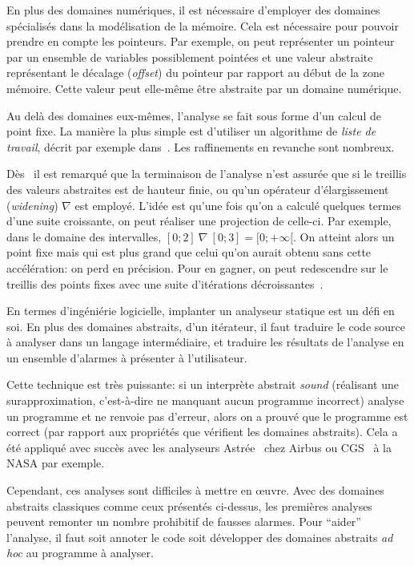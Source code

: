 En plus des domaines numériques, il est nécessaire d'employer des domaines
spécialisés dans la modélisation de la mémoire. Cela est nécessaire pour pouvoir
prendre en compte les pointeurs. Par exemple, on peut représenter un pointeur
par un ensemble de variables possiblement pointées et une valeur abstraite
représentant le décalage (\emph{offset}) du pointeur par rapport au début de la
zone mémoire. Cette valeur peut elle-même être abstraite par un domaine
numérique.

Au delà des domaines eux-mêmes, l'analyse se fait sous forme d'un calcul de
point fixe. La manière la plus simple est d'utiliser un algorithme de
\emph{liste de travail}, décrit par exemple dans~\cite{tapsoft95}. Les
raffinements en revanche sont nombreux.

Dès~\cite{Cousot77} il est remarqué que la terminaison de l'analyse n'est
assurée que si le treillis des valeurs abstraites est de hauteur finie, ou qu'un
opérateur d'élargissement (\emph{widening}) $\nabla$ est employé. L'idée est
qu'une fois qu'on a calculé quelques termes d'une suite croissante, on peut
réaliser une projection de celle-ci. Par exemple, dans le domaine des
intervalles, $[0;2]~\nabla~[0;3] = [0;+\infty[$. On atteint alors un point fixe
mais qui est plus grand que celui qu'on aurait obtenu sans cette accélération:
on perd en précision. Pour en gagner, on peut redescendre sur le treillis des
points fixes avec une suite d'itérations décroissantes~\cite{granger,policy}.

En termes d'ingéniérie logicielle, implanter un analyseur statique est un défi
en soi. En plus des domaines abstraits, d'un itérateur, il faut traduire le code
source à analyser dans un langage intermédiaire, et traduire les résultats de
l'analyse en un ensemble d'alarmes à présenter à l'utilisateur.

Cette technique est très puissante: si un interprète abstrait \emph{sound}
(réalisant une surapproximation, c'est-à-dire ne manquant aucun programme
incorrect) analyse un programme et ne renvoie pas d'erreur, alors on a prouvé
que le programme est correct (par rapport aux propriétés que vérifient les
domaines abstraits). Cela a été appliqué avec succès avec les analyseurs
Astrée~\cite{Astree04,Astree05,AstreeScale} chez Airbus ou CGS~\cite{cgs} à la
NASA par exemple.

Cependant, ces analyses sont difficiles à mettre en œuvre. Avec des domaines
abstraits classiques comme ceux présentés ci-dessus, les premières analyses
peuvent remonter un nombre prohibitif de fausses alarmes. Pour \enquote{aider}
l'analyse, il faut soit annoter le code soit développer des domaines abstraits
\emph{ad hoc} au programme à analyser.


